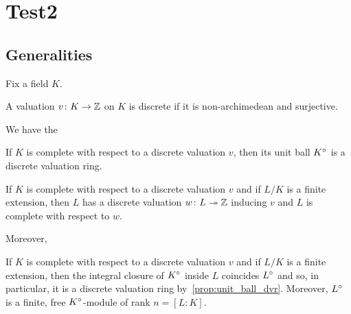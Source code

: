 %

\chapter{Test2}

\section{Generalities}
Fix a field $K$.
\begin{definition}
	\label{def:discrete-val}
	\leanok
	A valuation $v\colon K \to \mathbb{Z}$ on $K$ is discrete if it is non-archimedean and surjective.
\end{definition}

We have the

\begin{proposition}
	\label{prop:unit_ball_dvr}
	If $K$ is complete with respect to a discrete valuation $v$, then its unit ball ${K}^\circ$ is a discrete valuation ring.
\end{proposition}

\begin{lemma} 
	\label{lemma:val_L}
	If $K$ is complete with respect to a discrete valuation $v$ and if $L/K$ is a finite extension, then $L$ has a discrete valuation $w\colon L \twoheadrightarrow \mathbb{Z}$ inducing $v$ and $L$ is complete with respect to $w$.
\end{lemma}

Moreover,
\begin{proposition}
	\label{prop:unitball-L}
	If $K$ is complete with respect to a discrete valuation $v$ and if $L/K$ is a finite extension, then the integral closure of ${K}^\circ$ inside $L$ coincides ${L}^\circ$ and so, in particular, it is a discrete valuation ring by~\ref{prop:unit_ball_dvr}. Moreover, ${L}^\circ$ is a finite, free ${K}^\circ$-module of rank $n=[L:K]$.
\end{proposition}
